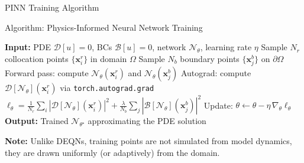 \documentclass[aspectratio=169,11pt]{beamer}
\newcommand{\emphc}[1]{\textcolor{harvardcrimson}{#1}}
\newcommand{\x}{\bm{x}}
\begin{document}
\begin{frame}{PINN Training Algorithm}
\begin{block}{Algorithm: Physics-Informed Neural Network Training}
\begin{algorithmic}
\footnotesize
\STATE \textbf{Input:} PDE $\mathcal{D}[u]=0$, BCs $\mathcal{B}[u]=0$, network $\mathcal{N}_\theta$, learning rate $\eta$
    \STATE Sample $N_r$ collocation points $\{\x_i^r\}$ in domain $\Omega$
    \STATE Sample $N_b$ boundary points $\{\x_j^b\}$ on $\partial\Omega$
    \STATE Forward pass: compute $\mathcal{N}_\theta(\x_i^r)$ and $\mathcal{N}_\theta(\x_j^b)$
    \STATE Autograd: compute $\mathcal{D}[\mathcal{N}_\theta](\x_i^r)$ via \texttt{torch.autograd.grad}
    \STATE $\ell_\theta = \frac{1}{N_r}\sum_i |\mathcal{D}[\mathcal{N}_\theta](\x_i^r)|^2 + \frac{\lambda}{N_b}\sum_j |\mathcal{B}[\mathcal{N}_\theta](\x_j^b)|^2$
    \STATE Update: $\theta \leftarrow \theta - \eta\,\nabla_\theta \ell_\theta$
\ENDFOR
\STATE \textbf{Output:} Trained $\mathcal{N}_{\theta^\star}$ approximating the PDE solution
\end{algorithmic}
\end{block}

\vspace{0.2em}
{\small \textbf{Note:} Unlike DEQNs, training points are \emphc{not} simulated from model dynamics, they are drawn uniformly (or adaptively) from the domain.}
\end{frame}
\end{document}
